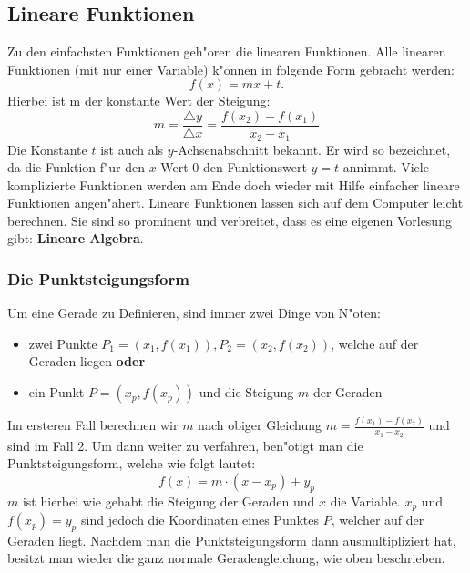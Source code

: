 \subsection{Lineare Funktionen}
Zu den einfachsten Funktionen geh"oren die linearen Funktionen. Alle linearen Funktionen (mit nur einer Variable) k"onnen in folgende Form gebracht werden: 
\begin{equation*}
f(x) = mx+t.
\end{equation*}
Hierbei ist m der konstante Wert der Steigung:
\begin{equation*}
m= \frac{\triangle y}{\triangle x}=\frac{f(x_2)-f(x_1)}{x_2-x_1}
\end{equation*}
Die Konstante $t$ ist auch als $y$-Achsenabschnitt bekannt. Er wird so bezeichnet, da die Funktion f"ur den $x$-Wert $0$ den Funktionswert $y = t$ annimmt. Viele komplizierte Funktionen werden am Ende doch wieder mit Hilfe einfacher lineare Funktionen angen"ahert. Lineare Funktionen lassen sich auf dem Computer leicht berechnen. Sie sind so prominent und verbreitet, dass es eine eigenen Vorlesung gibt: \textbf{Lineare Algebra}.


\subsubsection{Die Punktsteigungsform}
Um eine Gerade zu Definieren, sind immer zwei Dinge von N"oten:
\begin{itemize}
\item zwei Punkte $P_1 = (x_1, f(x_1)), P_2 = (x_2, f(x_2))$, welche auf der Geraden liegen \textbf{oder}
\item ein Punkt $P = (x_p, f(x_p))$ und die Steigung $m$ der Geraden
\end{itemize}
Im ersteren Fall berechnen wir $m$ nach obiger Gleichung $m = \frac{f(x_1) - f(x_2)}{x_1 - x_2}$ und sind im Fall 2. Um dann weiter zu verfahren, ben"otigt man die Punktsteigungsform, welche wie folgt lautet:
\begin{equation*}
f(x) = m \cdot (x-x_p) + y_p
\end{equation*}
$m$ ist hierbei wie gehabt die Steigung der Geraden und $x$ die Variable. $x_p$ und $f(x_p) = y_p$ sind jedoch die Koordinaten eines Punktes $P$, welcher auf der Geraden liegt. Nachdem man die Punktsteigungsform dann ausmultipliziert hat, besitzt man wieder die ganz normale Geradengleichung, wie oben beschrieben.

